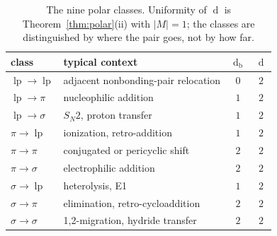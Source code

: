 \documentclass[11pt]{article}
\numberwithin{equation}{section}
\newcommand{\lp}{\operatorname{lp}}
\newcommand{\del}{\operatorname{d}}
\theoremstyle{plain}
\theoremstyle{definition}
\theoremstyle{remark}
\begin{document}
\begin{table}[htbp]
\centering
\footnotesize
\setlength{\tabcolsep}{5pt}
\caption{The nine polar classes.  Uniformity of $\del$ is
Theorem~\ref{thm:polar}(ii) with $|M|=1$; the classes are distinguished by
where the pair goes, not by how far.}
\label{tab:polar}
\begin{tabular}{@{}l l c c@{}}
\toprule
class & typical context & $\del_{\mathrm b}$ & $\del$ \\
\midrule
$\lp\to\lp$       & adjacent nonbonding-pair relocation & $0$ & $2$ \\
$\lp\to\pi$       & nucleophilic addition               & $1$ & $2$ \\
$\lp\to\sigma$    & $S_N2$, proton transfer             & $1$ & $2$ \\
$\pi\to\lp$       & ionization, retro-addition          & $1$ & $2$ \\
$\pi\to\pi$       & conjugated or pericyclic shift      & $2$ & $2$ \\
$\pi\to\sigma$    & electrophilic addition              & $2$ & $2$ \\
$\sigma\to\lp$    & heterolysis, E1                     & $1$ & $2$ \\
$\sigma\to\pi$    & elimination, retro-cycloaddition    & $2$ & $2$ \\
$\sigma\to\sigma$ & 1,2-migration, hydride transfer     & $2$ & $2$ \\
\bottomrule
\end{tabular}
\end{table}
\end{document}
